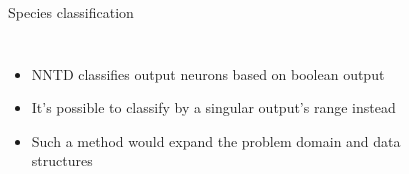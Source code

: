 \begin{frame}{Species classification}
  \begin{columns}
    \column{0.5\paperwidth}
    \begin{itemize}
      \item NNTD classifies output neurons based on boolean output
      \item It's possible to classify by a singular output's range instead
      \item Such a method would expand the problem domain and data structures
    \end{itemize}

    \column{0.5\paperwidth}
    \begin{figure}[htbp]
      \centering
      
    \end{figure}
  \end{columns}
\end{frame}
